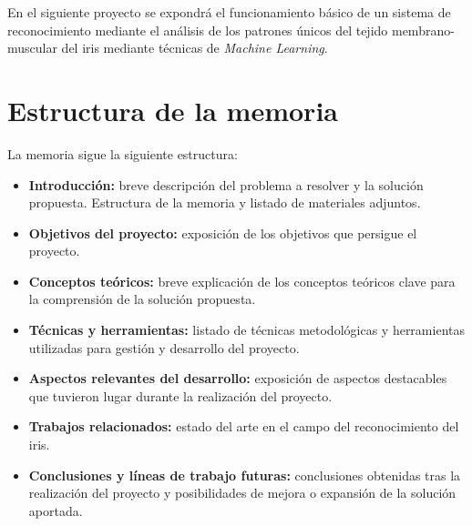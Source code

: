 
En el siguiente proyecto se expondrá el funcionamiento básico de un sistema de reconocimiento mediante el análisis de los patrones únicos del tejido membrano-muscular del iris mediante técnicas de \emph{Machine Learning}.

\section{Estructura de la memoria}\label{estructura-de-la-memoria}


La memoria sigue la siguiente estructura:
\begin{itemize}
\tightlist
\item
  \textbf{Introducción:} breve descripción del problema a resolver y la
  solución propuesta. Estructura de la memoria y listado de materiales
  adjuntos.
\item
  \textbf{Objetivos del proyecto:} exposición de los objetivos que
  persigue el proyecto.
\item
  \textbf{Conceptos teóricos:} breve explicación de los conceptos
  teóricos clave para la comprensión de la solución propuesta.
\item
  \textbf{Técnicas y herramientas:} listado de técnicas metodológicas y
  herramientas utilizadas para gestión y desarrollo del proyecto.
\item
  \textbf{Aspectos relevantes del desarrollo:} exposición de aspectos
  destacables que tuvieron lugar durante la realización del proyecto.
\item
  \textbf{Trabajos relacionados:} estado del arte en el campo del reconocimiento del iris.
\item
  \textbf{Conclusiones y líneas de trabajo futuras:} conclusiones
  obtenidas tras la realización del proyecto y posibilidades de mejora o
  expansión de la solución aportada.
\end{itemize}


